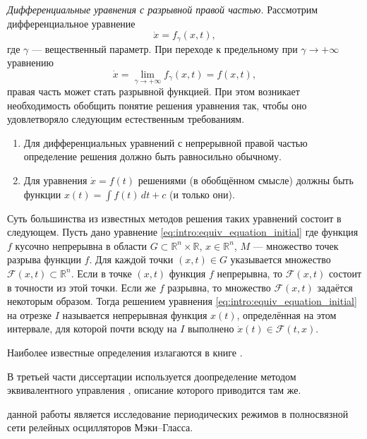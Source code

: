 \textit{Дифференциальные уравнения с разрывной правой частью.} Рассмотрим дифференциальное уравнение 
\[
\dot{x} = f_{\gamma}(x, t),
\]
где $\gamma$ --- вещественный параметр. При переходе к предельному при $\gamma \to +\infty$ уравнению
\begin{equation}
	\label{eq:intro:equiv_equation_initial}
	\dot{x} = \lim\limits_{\gamma \to +\infty}f_{\gamma}(x, t) = f(x, t),
\end{equation}
правая часть может стать разрывной функцией. При этом возникает необходимость обобщить понятие решения уравнения так, чтобы оно удовлетворяло следующим естественным требованиям.
\begin{enumerate}
	\item Для дифференциальных уравнений с непрерывной правой частью определение решения должно быть равносильно обычному.
	\item Для уравнения $\dot{x} = f(t)$ решениями (в обобщённом смысле) должны быть функции $x(t) = \int f(t)\, dt + c$ (и только они).
\end{enumerate}
Суть большинства из известных методов решения таких уравнений состоит в следующем. Пусть дано уравнение \eqref{eq:intro:equiv_equation_initial} где функция $f$ кусочно непрерывна в области $G \subset \mathbb{R}^n \times \mathbb{R}$, $x \in \mathbb{R}^n$, $M$ --- множество точек разрыва функции $f$. Для каждой точки $(x, t) \in G$ указывается множество $\mathcal{F}(x, t) \subset \mathbb{R}^n$. Если в точке $(x, t)$ функция $f$ непрерывна, то $\mathcal{F}(x, t)$ состоит в точности из этой точки. Если же $f$ разрывна, то множество $\mathcal{F}(x, t)$ задаётся некоторым образом. Тогда решением уравнения \eqref{eq:intro:equiv_equation_initial} на отрезке $I$ называется непрерывная функция $x(t)$, определённая на этом интервале, для которой почти всюду на $I$ выполнено $\dot{x}(t) \in \mathcal{F}(t, x)$.

Наиболее известные определения излагаются в книге \cite[\S 4]{Filippov1988}.

В третьей части диссертации используется доопределение методом эквивалентного управления \cite{Utkin1981}, описание которого приводится там же.

\bigskip

{\aim} данной работы является исследование периодических режимов в полносвязной сети релейных осцилляторов Мэки--Гласса.


